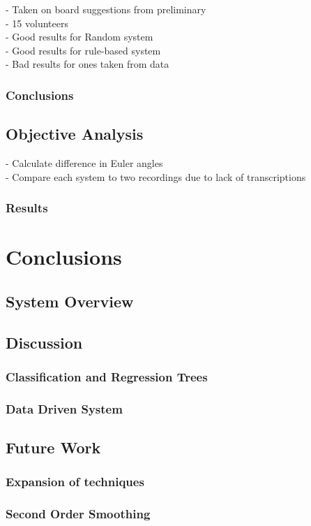 \documentclass[bsc,frontabs,twoside,singlespacing,parskip]{infthesis}
\begin{document}
- Taken on  board suggestions from preliminary \\
- 15 volunteers \\
- Good results for Random system \\
- Good results for rule-based system \\
- Bad results for ones taken from data \\

\subsection{Conclusions}


\section{Objective Analysis}

- Calculate difference in Euler angles\\
- Compare each system to two recordings due to lack of transcriptions\\

\subsection{Results}
\chapter{Conclusions}

\section{System Overview}

\section{Discussion}
	\subsection{Classification and Regression Trees}
	\subsection{Data Driven System}
\section{Future Work}
	\subsection{Expansion of techniques}
	\subsection{Second Order Smoothing}
	


\end{document}
